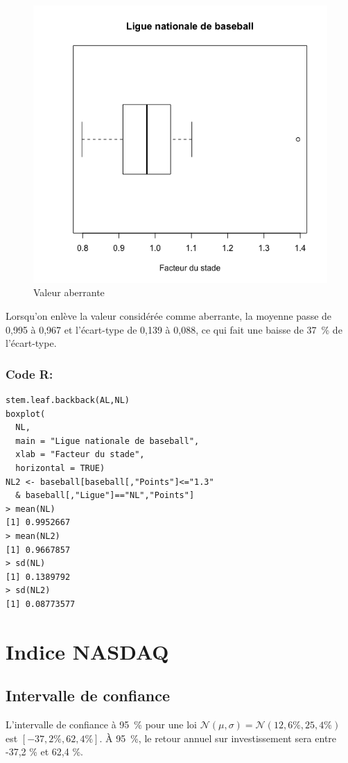 \documentclass[10pt,twocolumn]{article}
\begin{document}
\begin{figure}[htbp]
	\caption{Valeur aberrante}
	\label{baseballBoxplot}
	\centering
	\includegraphics[width=\linewidth]{d1_baseballBoxplot}
\end{figure}

Lorsqu’on enlève la valeur considérée comme aberrante, la moyenne passe de 0,995 à 0,967 et l’écart-type de 0,139 à 0,088, ce qui fait une baisse de 37~\% de l’écart-type.

\subsubsection*{Code R:}
\begin{verbatim}
stem.leaf.backback(AL,NL)
boxplot(
  NL,
  main = "Ligue nationale de baseball",
  xlab = "Facteur du stade",
  horizontal = TRUE)
NL2 <- baseball[baseball[,"Points"]<="1.3"
  & baseball[,"Ligue"]=="NL","Points"]
> mean(NL)
[1] 0.9952667
> mean(NL2)
[1] 0.9667857
> sd(NL)
[1] 0.1389792
> sd(NL2)
[1] 0.08773577
\end{verbatim}



\section{Indice NASDAQ}
\subsection{Intervalle de confiance}
L’intervalle de confiance à 95~\% pour une loi $\mathcal{N}(\mu,\sigma) = \mathcal{N}(12,6 \%, 25,4\%)$ est $[-37,2 \%, 62,4 \%]$. À 95~\%, le retour annuel sur investissement sera entre -37,2 \% et 62,4 \%.
\end{document}
